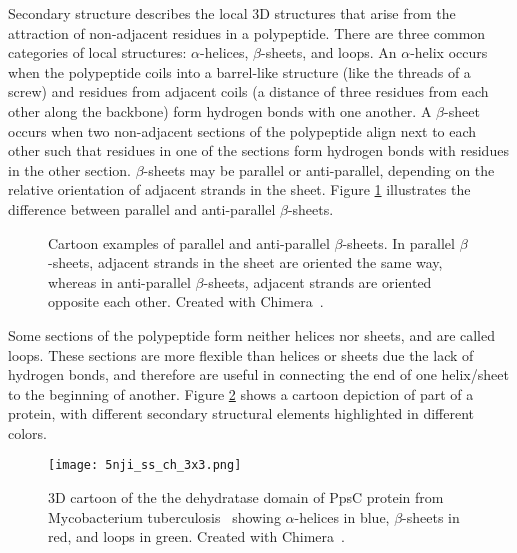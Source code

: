 Secondary structure describes the local 3D structures that arise from the attraction of non-adjacent residues in a polypeptide.
There are three common categories of local structures: $\alpha$-helices, $\beta$-sheets, and loops.
An  $\alpha$-helix occurs when the polypeptide coils into a barrel-like structure (like the threads of a screw) and residues from adjacent coils (a distance of three residues from each other along the backbone) form hydrogen bonds with one another.
A $\beta$-sheet occurs when two non-adjacent sections of the polypeptide align next to each other such that residues in one of the sections form hydrogen bonds with residues in the other section.
$\beta$-sheets may be parallel or anti-parallel, depending on the relative orientation of adjacent strands in the sheet.
Figure \ref{fig:beta} illustrates the difference between parallel and anti-parallel $\beta$-sheets.
\begin{figure}
	\centering
	\hfill
	\caption{Cartoon examples of parallel and anti-parallel $\beta$-sheets. In parallel $\beta$-sheets, adjacent strands in the sheet are oriented the same way, whereas in anti-parallel $\beta$-sheets, adjacent strands are oriented opposite each other. Created with Chimera~\cite{pettersen2004}.}
	\label{fig:beta}
\end{figure}
Some sections of the polypeptide form neither helices nor sheets, and are called loops.
These sections are more flexible than helices or sheets due the lack of hydrogen bonds, and therefore are useful in connecting the end of one helix/sheet to the beginning of another.
Figure \ref{fig:5nji_ss} shows a cartoon depiction of part of a protein, with different secondary structural elements highlighted in different colors.
	
\begin{figure}
	\centering
	\texttt{[image: 5nji\_ss\_ch\_3x3.png]}
	\caption{3D cartoon of the the dehydratase domain of PpsC protein from Mycobacterium tuberculosis~\cite{faille2017} showing $\alpha$-helices in blue, $\beta$-sheets in red, and loops in green. Created with Chimera~\cite{pettersen2004}.}
	\label{fig:5nji_ss}
\end{figure}

